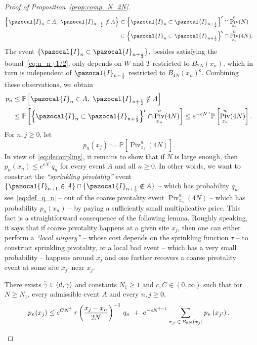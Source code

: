 \documentclass[AHL,Unicode,longabstracts,published]{cedram}
\DeclareMathOperator{\Piv}{Piv}
\renewcommand{\P}{\mathbb{P}}
\newcommand{\sfc}{\mathsf{c}}
\let\oldtilde\tilde
\renewcommand*{\tilde}[1]{\mathchoice{\widetilde{#1}}{\widetilde{#1}}{\oldtilde{#1}}{\oldtilde{#1}}}
\begin{document}
\begin{proof}[Proof of Proposition~\ref{prop:comp_N_2N}]
\begin{align*}
\left\{\pazocal{I}_n\in A,~\pazocal{I}_{n+\frac12}\notin A\right\} &\subset \left\{\pazocal{I}_{n}\subset \pazocal{I}_{n+\frac12}\right\}^{\sfc} \cap \Piv^{n}_{x_n}(N) \\
&\subset \left\{\pazocal{I}_{n}\subset \pazocal{I}_{n+\frac12}\right\}^{\sfc} \cap \Piv^{n}_{x_n}(4N).
\end{align*}
The event $\{\pazocal{I}_{n}\subset \pazocal{I}_{n+\frac12}\}$, besides satisfying the bound~\eqref{eq:n_n+1/2}, only depends on $W$ and $T$ restricted to $B_{2N}(x_n)$, which in turn is independent of $\pazocal{I}_{n+\frac12}$ restricted to $B_{4N}(x_n)^{\sfc}$. Combining these observations, we obtain
\begin{align}\label{eq:decoupling}
\begin{split}
p_n&\leq\P\left[\pazocal{I}_n\in A,~\pazocal{I}_{n+\frac12}\notin A\right] \\
&\leq \P\left[\left\{\pazocal{I}_{n}\subset \pazocal{I}_{n+\frac12}\right\}^{\sfc}\cap\Piv^{n}_{x_n}(4N)\right] \leq e^{-cN^\gamma} \P\left[\Piv^{n}_{x_n}(4N)\right].
\end{split}
\end{align}
For $n,j\geq0$, let
\begin{equation}
p_n(x_j):=\P\left[\Piv^{n}_{x_j}(4N)\right].
\end{equation}
In view of~\eqref{eq:decoupling}, it remains to show that if $N$ is large enough, then $p_n(x_n)\leq e^{cN^\gamma}q_n$ for every event $A$ and all $n\geq0$. In other words, we want to construct the \emph{``sprinkling pivotality''} event $\{\pazocal{I}_{n+1}\in A\}\cap \{\pazocal{I}_{n+\frac12}\notin A\}$ -- which has probability $q_n$, see~\eqref{eq:def_q_n} -- out of the coarse pivotality event $\Piv^n_{x_n}(4N)$ -- which has probability $p_n(x_n)$ -- by paying a sufficiently small multiplicative price. This fact is a straightforward consequence of the following lemma. Roughly speaking, it says that if coarse pivotality happens at a given site $x_j$, then one can either perform a \emph{``local surgery''} -- whose cost depends on the sprinkling function $\tau$ -- to construct sprinkling pivotality, or a local bad event -- which has a very small probability -- happens around $x_j$ and one further recovers a coarse pivotality event at some site $x_{j'}$ near $x_j$.

\begin{lemm}\label{lem:conv_bound}
There exists $\tilde{\gamma}\in(d,\gamma)$ and constants $N_1\geq1$ and $c,C\in(0,\infty)$ such that for $N\geq N_1$, every admissible event $A$ and every $n,j\geq0$,
\begin{equation}\label{eq:conv_bound}
p_n(x_j)\leq e^{CN^{\tilde{\gamma}}}\, \tau\left(\frac{x_j-x_n}{2N}\right)^{-1} \,q_n~+~e^{-cN^{\tilde{\gamma}-1}} \sum_{x_{j'}\,\in\, B_{8N}(x_j)} p_n\left(x_{j'}\right).
\end{equation}
\end{lemm}


\end{proof}
\end{document}

